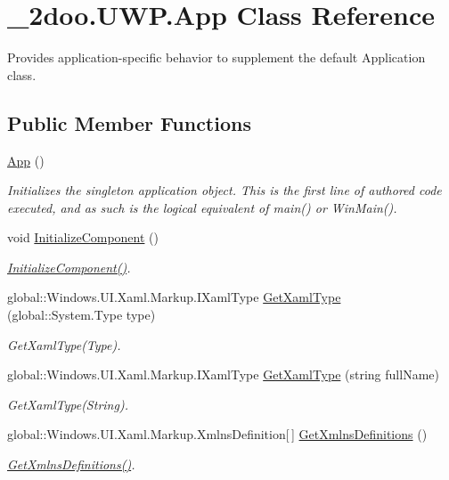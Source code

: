 \hypertarget{class__2doo_1_1_u_w_p_1_1_app}{
\section{\_\-2doo.UWP.App Class Reference}
\label{class__2doo_1_1_u_w_p_1_1_app}
}
Provides application-specific behavior to supplement the default Application class.  


\subsection*{Public Member Functions}
\begin{CompactItemize}
\item 
\hyperlink{class__2doo_1_1_u_w_p_1_1_app_2c6bd80c4f37f81312b4b71978784204}{App} ()
\begin{CompactList}\small\item\em Initializes the singleton application object. This is the first line of authored code executed, and as such is the logical equivalent of main() or WinMain(). \item\end{CompactList}\item 
void \hyperlink{class__2doo_1_1_u_w_p_1_1_app_75c48512b7698dc3adc4c9613faf9705}{InitializeComponent} ()
\begin{CompactList}\small\item\em \hyperlink{class__2doo_1_1_u_w_p_1_1_app_75c48512b7698dc3adc4c9613faf9705}{InitializeComponent()}. \item\end{CompactList}\item 
global::Windows.UI.Xaml.Markup.IXamlType \hyperlink{class__2doo_1_1_u_w_p_1_1_app_231de22afc574dbcb55d80162d722b10}{GetXamlType} (global::System.Type type)
\begin{CompactList}\small\item\em GetXamlType(Type). \item\end{CompactList}\item 
global::Windows.UI.Xaml.Markup.IXamlType \hyperlink{class__2doo_1_1_u_w_p_1_1_app_645f7fd0ab0344a892c3fb95b6685bff}{GetXamlType} (string fullName)
\begin{CompactList}\small\item\em GetXamlType(String). \item\end{CompactList}\item 
global::Windows.UI.Xaml.Markup.XmlnsDefinition\mbox{[}$\,$\mbox{]} \hyperlink{class__2doo_1_1_u_w_p_1_1_app_8dc1645a83a050e1a2fde7ce645f443c}{GetXmlnsDefinitions} ()
\begin{CompactList}\small\item\em \hyperlink{class__2doo_1_1_u_w_p_1_1_app_8dc1645a83a050e1a2fde7ce645f443c}{GetXmlnsDefinitions()}. \item\end{CompactList}\end{CompactItemize}
